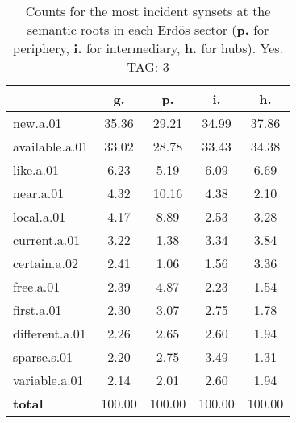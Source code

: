 \begin{table}[h!]
\begin{center}
\begin{tabular}{| l | c | c | c | c |}\hline
 & g. & p. & i. & h. \\\hline
new.a.01 & 35.36  & 29.21  & 34.99  & 37.86 \\\hline
available.a.01 & 33.02  & 28.78  & 33.43  & 34.38 \\\hline
like.a.01 & 6.23  & 5.19  & 6.09  & 6.69 \\\hline
near.a.01 & 4.32  & 10.16  & 4.38  & 2.10 \\\hline
local.a.01 & 4.17  & 8.89  & 2.53  & 3.28 \\\hline
current.a.01 & 3.22  & 1.38  & 3.34  & 3.84 \\\hline
certain.a.02 & 2.41  & 1.06  & 1.56  & 3.36 \\\hline
free.a.01 & 2.39  & 4.87  & 2.23  & 1.54 \\\hline
first.a.01 & 2.30  & 3.07  & 2.75  & 1.78 \\\hline
different.a.01 & 2.26  & 2.65  & 2.60  & 1.94 \\\hline
sparse.s.01 & 2.20  & 2.75  & 3.49  & 1.31 \\\hline
variable.a.01 & 2.14  & 2.01  & 2.60  & 1.94 \\\hline
{{\bf total}} & 100.00  & 100.00  & 100.00  & 100.00 \\\hline
\end{tabular}
\caption{Counts for the most incident synsets at the semantic roots in each Erd\"os sector ({\bf p.} for periphery, {\bf i.} for intermediary, {\bf h.} for hubs). Yes. TAG: 3}
\end{center}
\end{table}